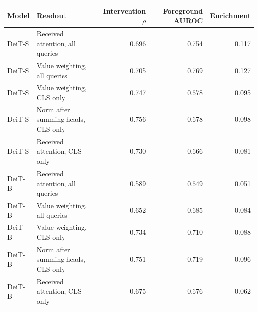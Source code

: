 \begin{tabular}{@{}llrrr@{}}
\toprule
Model & Readout & Intervention $\rho$ & Foreground AUROC & Enrichment \\
\midrule
DeiT-S & Received attention, all queries & 0.696 & 0.754 & 0.117 \\
DeiT-S & Value weighting, all queries & 0.705 & 0.769 & 0.127 \\
DeiT-S & Value weighting, CLS only & 0.747 & 0.678 & 0.095 \\
DeiT-S & Norm after summing heads, CLS only & 0.756 & 0.678 & 0.098 \\
DeiT-S & Received attention, CLS only & 0.730 & 0.666 & 0.081 \\
DeiT-B & Received attention, all queries & 0.589 & 0.649 & 0.051 \\
DeiT-B & Value weighting, all queries & 0.652 & 0.685 & 0.084 \\
DeiT-B & Value weighting, CLS only & 0.734 & 0.710 & 0.088 \\
DeiT-B & Norm after summing heads, CLS only & 0.751 & 0.719 & 0.096 \\
DeiT-B & Received attention, CLS only & 0.675 & 0.676 & 0.062 \\
\bottomrule
\end{tabular}
